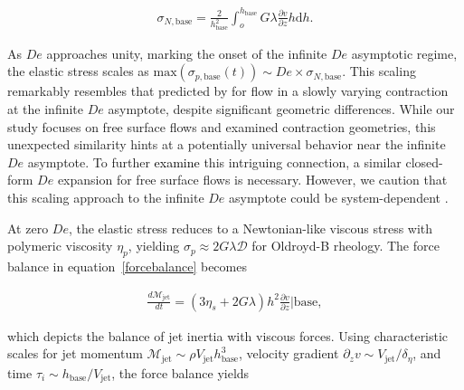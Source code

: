 \documentclass{jfm}
\newcommand{\DL}[1]{{\textcolor{black}{#1}}}
\newcommand{\VS}[1]{{\textcolor{black}{#1}}}
\newcommand{\oo}{\color{black} \normalfont}
\newcommand{\bb}{\color{black} \normalfont}
\begin{document}
\begin{align}
	\sigma_{N,\text{base}} =  \frac{2}{h_{\text{base}}^2}\int_{o}^{h_{\text{base}}} G\lambda\frac{\partial v}{\partial z} h\mathrm{d}h.
\end{align}

\oo
As $De$ approaches unity, marking the onset of the infinite $De$ asymptotic regime, the elastic stress scales as $\text{max}(\sigma_{p,\text{base}}(t)) \sim De \times \sigma_{N,\text{base}}$.
This scaling remarkably resembles that predicted by \citet{boyko2024flow} for flow in a slowly varying contraction at the infinite $De$ asymptote, despite significant geometric differences. While our study focuses on free surface flows and \citet{boyko2024flow} examined contraction geometries, this unexpected similarity hints at a potentially universal behavior near the infinite $De$ asymptote. To further \VS{examine} this intriguing connection, a similar closed-form $De$ expansion for free surface flows is necessary. However, we caution that this scaling approach to the infinite $De$ asymptote could be system-dependent \citep{hinch2024fast}.

At zero $De$, the elastic stress reduces to a Newtonian-like viscous stress with polymeric viscosity $\eta_p$, yielding $\sigma_p \approx 2G\lambda\boldsymbol{\mathcal{D}}$ for Oldroyd-B rheology. The force balance in equation~\eqref{forcebalance} becomes
\bb

\begin{align}
	\frac{d \mathcal{M}_\text{jet}}{d t} = \left(3\eta_s + 2G\lambda\right)h^2\frac{\partial v}{\partial z}\Bigg|{\text{base}},
	\label{etaeffect}
\end{align}

\noindent which depicts the balance of jet inertia with viscous forces.
\oo Using characteristic scales for jet momentum $\mathcal{M}_{\text{jet}} \sim \rho V_\text{jet} h_{\text{base}}^3$, velocity gradient $\partial_zv \sim V_{\text{jet}}/\delta_\eta$, and time $\tau_i \sim h_{\text{base}}/V_\text{jet}$, the force balance yields\bb
\end{document}
